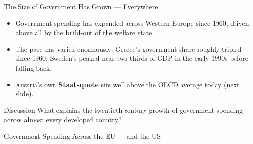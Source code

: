 \documentclass[11pt,aspectratio=169]{beamer}
\begin{document}
\begin{frame}{ The Size of Government Has Grown --- Everywhere}
  \begin{itemize}
    \item Government spending has expanded across Western Europe since 1960, driven above all by the build-out of the welfare state.
    \item The pace has varied enormously: Greece's government share roughly tripled since 1960; Sweden's peaked near two-thirds of GDP in the early 1990s before falling back.
    \item Austria's own \textbf{Staatsquote} sits well above the OECD average today (next slide).
  \end{itemize}
  \begin{block}{Discussion}
    What explains the twentieth-century growth of government spending across almost every developed country?
  \end{block}

\end{frame}

\begin{frame}{Government Spending Across the EU --- and the US}
  \begin{center}
  \end{center}

\end{frame}
\end{document}
